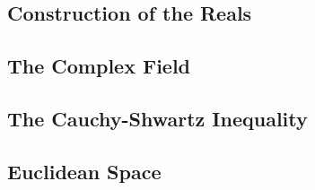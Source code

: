 \subsection{Construction of the Reals}

\subsection{The Complex Field}

\subsection{The Cauchy-Shwartz Inequality}

\subsection{Euclidean Space}



